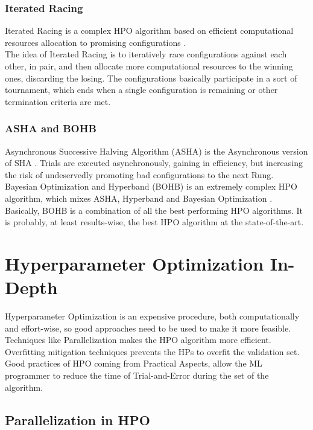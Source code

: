 \subsubsection{Iterated Racing}

Iterated Racing is a complex HPO algorithm based on efficient computational resources allocation to promising configurations \cite{Tesi-1.8}.
\\[0.3cm]The idea of Iterated Racing is to iteratively race configurations against each other, in pair, and then allocate more computational resources to the winning ones, discarding the losing.
The configurations basically participate in a sort of tournament, which ends when a single configuration is remaining or other termination criteria are met.

\subsubsection{ASHA and BOHB}

Asynchronous Successive Halving Algorithm (ASHA) is the Asynchronous version of SHA \cite{OptunaPruners-AsynchronousSuccessiveHalvingAlgorithm}. Trials are executed asynchronously, gaining in efficiency, but increasing the risk of undeservedly promoting bad configurations to the next Rung.
\\[0.3cm]Bayesian Optimization and Hyperband (BOHB) is an extremely complex HPO algorithm, which mixes ASHA, Hyperband and Bayesian Optimization \cite{Tesi-1.10} \cite{Tesi-1.9} \cite{AutomatedML}.
Basically, BOHB is a combination of all the best performing HPO algorithms. It is probably, at least results-wise, the best HPO algorithm at the state-of-the-art.

\section{Hyperparameter Optimization In-Depth}

Hyperparameter Optimization is an expensive procedure, both computationally and effort-wise, so good approaches need to be used to make it more feasible.
\\[0.3cm]Techniques like Parallelization makes the HPO algorithm more efficient.
Overfitting mitigation techniques prevents the HPs to overfit the validation set.
Good practices of HPO coming from Practical Aspects, allow the ML programmer to reduce the time of Trial-and-Error during the set of the algorithm.

\subsection{Parallelization in HPO}

